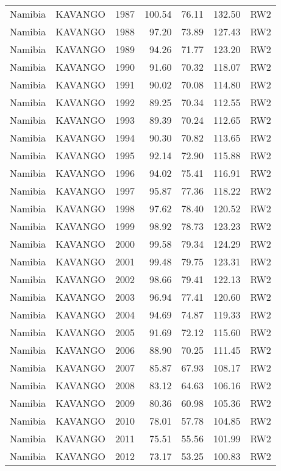 \begin{longtable}{lllrrrl}
  Namibia & KAVANGO & 1987 & 100.54 & 76.11 & 132.50 & RW2 \\ 
  Namibia & KAVANGO & 1988 & 97.20 & 73.89 & 127.43 & RW2 \\ 
  Namibia & KAVANGO & 1989 & 94.26 & 71.77 & 123.20 & RW2 \\ 
  Namibia & KAVANGO & 1990 & 91.60 & 70.32 & 118.07 & RW2 \\ 
  Namibia & KAVANGO & 1991 & 90.02 & 70.08 & 114.80 & RW2 \\ 
  Namibia & KAVANGO & 1992 & 89.25 & 70.34 & 112.55 & RW2 \\ 
  Namibia & KAVANGO & 1993 & 89.39 & 70.24 & 112.65 & RW2 \\ 
  Namibia & KAVANGO & 1994 & 90.30 & 70.82 & 113.65 & RW2 \\ 
  Namibia & KAVANGO & 1995 & 92.14 & 72.90 & 115.88 & RW2 \\ 
  Namibia & KAVANGO & 1996 & 94.02 & 75.41 & 116.91 & RW2 \\ 
  Namibia & KAVANGO & 1997 & 95.87 & 77.36 & 118.22 & RW2 \\ 
  Namibia & KAVANGO & 1998 & 97.62 & 78.40 & 120.52 & RW2 \\ 
  Namibia & KAVANGO & 1999 & 98.92 & 78.73 & 123.23 & RW2 \\ 
  Namibia & KAVANGO & 2000 & 99.58 & 79.34 & 124.29 & RW2 \\ 
  Namibia & KAVANGO & 2001 & 99.48 & 79.75 & 123.31 & RW2 \\ 
  Namibia & KAVANGO & 2002 & 98.66 & 79.41 & 122.13 & RW2 \\ 
  Namibia & KAVANGO & 2003 & 96.94 & 77.41 & 120.60 & RW2 \\ 
  Namibia & KAVANGO & 2004 & 94.69 & 74.87 & 119.33 & RW2 \\ 
  Namibia & KAVANGO & 2005 & 91.69 & 72.12 & 115.60 & RW2 \\ 
  Namibia & KAVANGO & 2006 & 88.90 & 70.25 & 111.45 & RW2 \\ 
  Namibia & KAVANGO & 2007 & 85.87 & 67.93 & 108.17 & RW2 \\ 
  Namibia & KAVANGO & 2008 & 83.12 & 64.63 & 106.16 & RW2 \\ 
  Namibia & KAVANGO & 2009 & 80.36 & 60.98 & 105.36 & RW2 \\ 
  Namibia & KAVANGO & 2010 & 78.01 & 57.78 & 104.85 & RW2 \\ 
  Namibia & KAVANGO & 2011 & 75.51 & 55.56 & 101.99 & RW2 \\ 
  Namibia & KAVANGO & 2012 & 73.17 & 53.25 & 100.83 & RW2 \\ 

\end{longtable}
